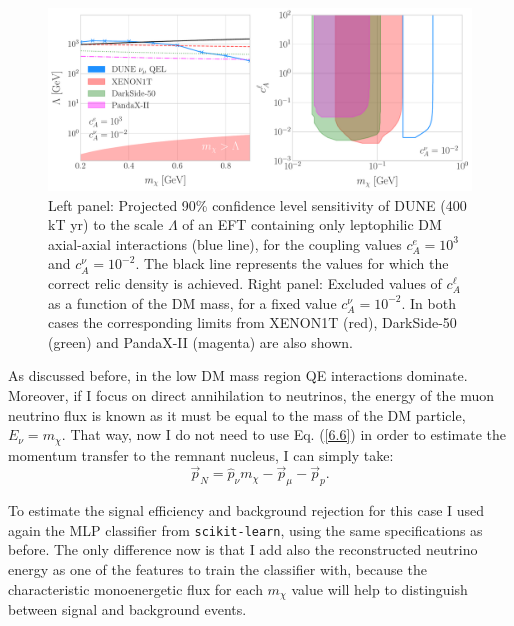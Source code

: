 \begin{figure}[t]
	\centering
	\includegraphics[width=1\linewidth]{Images/DM_Analysis/eft_bounds.pdf}
	\caption[Projected 90\% confidence level sensitivity of DUNE (400 kT yr) to the scale $\Lambda$ of an EFT containing only leptophilic DM axial-axial interactions.]{Left panel: Projected 90\% confidence level sensitivity of DUNE (400 kT yr) to the scale $\Lambda$ of an EFT containing only leptophilic DM axial-axial interactions (blue line), for the coupling values $c_{A}^{e} = 10^{3}$ and $c_{A}^{\nu} = 10^{-2}$. The black line represents the values for which the correct relic density is achieved. Right panel: Excluded values of $c_{A}^{\ell}$ as a function of the DM mass, for a fixed value $c_{A}^{\nu} = 10^{-2}$. In both cases the corresponding limits from XENON1T \cite{XENON2019} (red), DarkSide-50 \cite{DarkSide2022} (green) and PandaX-II \cite{PandaX-II2021} (magenta) are also shown.}
	\label{fig:eft_bounds}
\end{figure}

As discussed before, in the low DM mass region QE interactions dominate. Moreover, if I focus on direct annihilation to neutrinos, the energy of the muon neutrino flux is known as it must be equal to the mass of the DM particle, $E_{\nu} = m_{\chi}$. That way, now I do not need to use Eq. (\ref{6.6}) in order to estimate the momentum transfer to the remnant nucleus, I can simply take:
\begin{equation}\label{7.6}
	\vec{p}_{N} = \hat{p}_{\nu} m_{\chi} - \vec{p}_{\mu} - \vec{p}_{p}.
\end{equation}

To estimate the signal efficiency and background rejection for this case I used again the MLP classifier from \texttt{scikit-learn}, using the same specifications as before. The only difference now is that I add also the reconstructed neutrino energy as one of the features to train the classifier with, because the characteristic monoenergetic flux for each $m_{\chi}$ value will help to distinguish between signal and background events.

